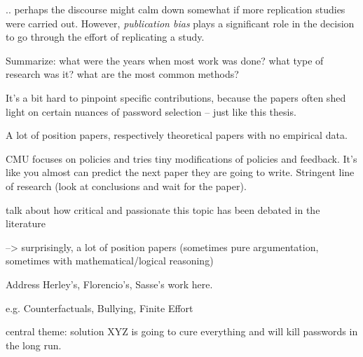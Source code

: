 .. perhaps the discourse might calm down somewhat if more replication studies were carried out. However, \textit{publication bias} plays a significant role in the decision to go through the effort of replicating a study. 


Summarize: what were the years when most work was done? what type of research was it? what are the most common methods?

It's a bit hard to pinpoint specific contributions, because the papers often shed light on certain nuances of password selection -- just like this thesis.

A lot of position papers, respectively theoretical papers with no empirical data.

CMU focuses on policies and tries tiny modifications of policies and feedback. It's like you almost can predict the next paper they are going to write. Stringent line of research (look at conclusions and wait for the paper).


talk about how critical and passionate this topic has been debated in the literature

--> surprisingly, a lot of position papers (sometimes pure argumentation, sometimes with mathematical/logical reasoning) 

Address Herley's, Florencio's, Sasse's work here. 

e.g. Counterfactuals, Bullying, Finite Effort 


central theme: solution XYZ is going to cure everything and will kill passwords in the long run. 


